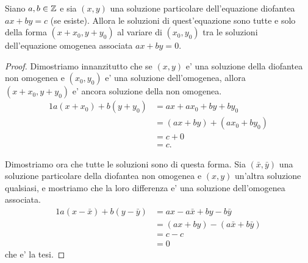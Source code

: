 \begin{theorem}  \label{sol_diofantea_non_omog}
    Siano $a, b \in \mathbb{Z}$ e sia $(x, y)$ una soluzione particolare dell'equazione diofantea $ax + by = c$ (se esiste). Allora le soluzioni di quest'equazione sono tutte e solo della forma $(x + x_0, y + y_0)$ al variare di $(x_0, y_0)$ tra le soluzioni dell'equazione omogenea associata $ax + by = 0$.
\end{theorem}
\begin{proof}
    Dimostriamo innanzitutto che se $(x, y)$ e' una soluzione della diofantea non omogenea e $(x_0, y_0)$ e' una soluzione dell'omogenea, allora $(x+x_0, y+y_0)$ e' ancora soluzione della non omogenea.
    \begin{alignat*}{1}
        a(x + x_0) + b(y + y_0) &= ax + ax_0 + by + by_0 \\
                                &= (ax + by) + (ax_0 + by_0) \\
                                &= c + 0\\
                                &= c.
    \end{alignat*}

    Dimostriamo ora che tutte le soluzioni sono di questa forma. Sia $(\bar{x}, \bar{y})$ una soluzione particolare della diofantea non omogenea e $(x, y)$ un'altra soluzione qualsiasi, e mostriamo che la loro differenza e' una soluzione dell'omogenea associata.
    \begin{alignat*}
        {1}
        a(x - \bar{x}) + b(y - \bar{y}) &= ax - a\bar{x} + by - b\bar{y} \\
                                        &= (ax + by) - (a\bar{x} + b\bar{y}) \\
                                        &= c - c\\
                                        &= 0
    \end{alignat*}
    che e' la tesi.
\end{proof}

